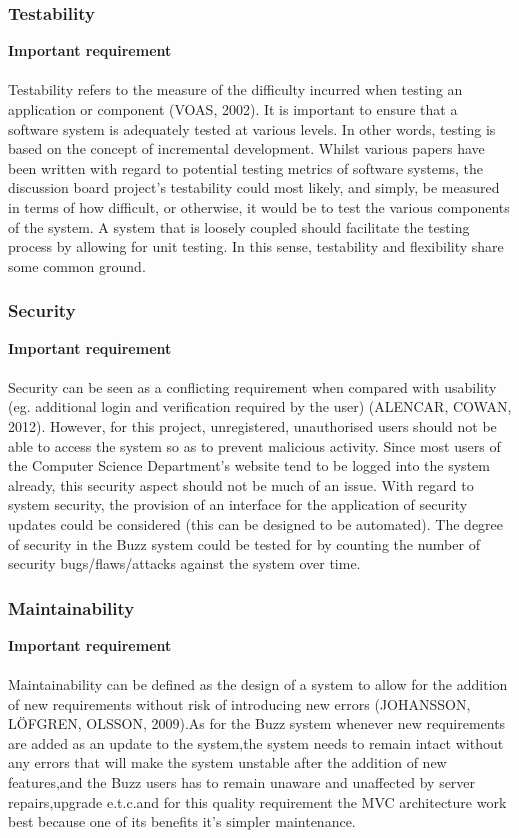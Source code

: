 \documentclass[a4paper]{article}
\begin{document}
\subsubsection{Testability}
\textbf{Important requirement}
\\
\\Testability refers to the measure of the difficulty incurred when testing an application or component (VOAS, 2002). It is important to ensure that a software system is adequately tested at various levels. In other words, testing is based on the concept of incremental development. Whilst various papers have been written with regard to potential testing metrics of software systems, the discussion board project’s testability could most likely, and simply, be measured in terms of how difficult, or otherwise, it would be to test the various components of the system. A system that is loosely coupled should facilitate the testing process by allowing for unit testing. In this sense, testability and flexibility share some common ground.


\subsubsection{Security}
\textbf{Important requirement}
\\
\\Security can be seen as a conflicting requirement when compared with usability (eg. additional login and verification required by the user) (ALENCAR, COWAN, 2012). However, for this project, unregistered, unauthorised users should not be able to access the system so as to prevent malicious activity. Since most users of the Computer Science Department’s website tend to be logged into the system already, this security aspect should not be much of an issue. With regard to system security, the provision of an interface for the application of security updates could be considered (this can be designed to be automated). The degree of security in the Buzz system could be tested for by counting the number of security bugs/flaws/attacks against the system over time.

\subsubsection{Maintainability}
\textbf{Important requirement}
\\
\\Maintainability can be defined as the design of a system to allow for the addition of new requirements without risk of introducing new errors (JOHANSSON, LÖFGREN, OLSSON, 2009).As for the Buzz system whenever new requirements are added as an update to the system,the system needs to remain intact without any errors that will make the system unstable after the addition of new features,and the Buzz users has to remain unaware and unaffected by server repairs,upgrade e.t.c.and for this quality requirement the MVC architecture work best because one of its benefits it's simpler maintenance.
\end{document}
